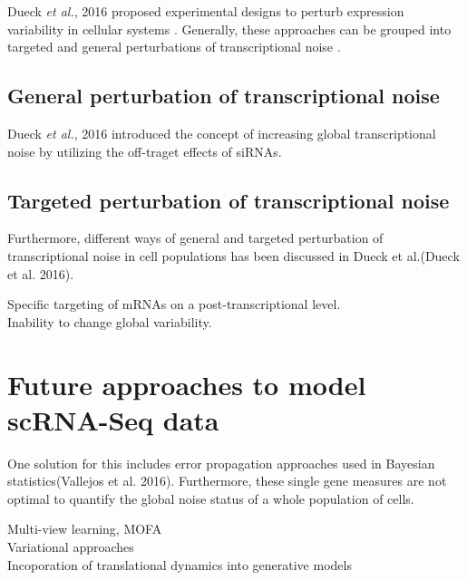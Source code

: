 Dueck \emph{et al.}, 2016 proposed experimental designs to perturb expression variability in cellular systems \citep{Dueck2016}. Generally, these approaches can be grouped into targeted and general perturbations of transcriptional noise \citep{Dueck2016}.

\subsection{General perturbation of transcriptional noise} 

Dueck \emph{et al.}, 2016 introduced the concept of increasing global transcriptional noise by utilizing the off-traget effects of \glspl{siRNA}. 

\subsection{Targeted perturbation of transcriptional noise} 


Furthermore, different ways of general and targeted perturbation of transcriptional noise in cell populations has been discussed in Dueck et al.(Dueck et al. 2016). 


Specific targeting of mRNAs on a post-transcriptional level.\\

Inability to change global variability. \\


\section{Future approaches to model scRNA-Seq data}

One solution for this includes error propagation approaches used in Bayesian statistics(Vallejos et al. 2016). Furthermore, these single gene measures are not optimal to quantify the global noise status of a whole population of cells.

Multi-view learning, MOFA\\
Variational approaches\\
Incoporation of translational dynamics into generative models

